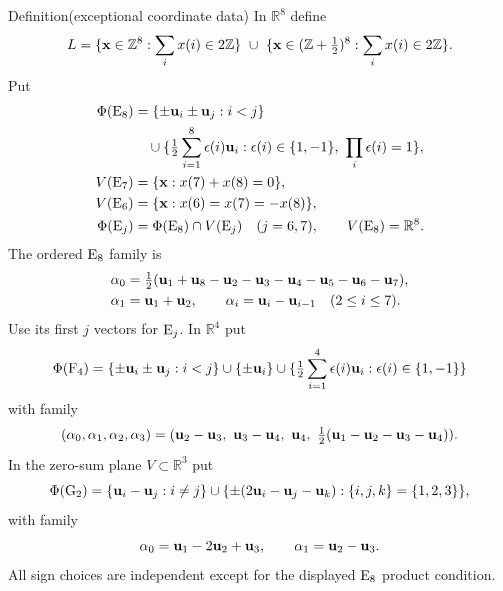 \begin{namedresult}{Definition}{(exceptional coordinate data)}\label{def:rem-exceptional}
In $\mathbb R^8$ define
\begin{equation}\label{eq:E-lattice}
 L=\{{\mathbf x}\in\mathbb Z^8:\sum_i x(i)\in2\mathbb Z\}
 \ \cup\
 \{{\mathbf x}\in(\mathbb Z+\tfrac12)^8:\sum_i x(i)\in2\mathbb Z\}.
\end{equation}
Put
\[
\begin{aligned}
\Phi(\mathrm{E}_8)&=\{\pm{\mathbf u}_i\pm{\mathbf u}_j:i<j\}\\
&\quad\cup\{\tfrac12\sum_{i=1}^8\epsilon(i){\mathbf u}_i:
                \epsilon(i)\in\{1,-1\},\ \prod_i\epsilon(i)=1\},\\
V(\mathrm{E}_7)&=\{{\mathbf x}:x(7)+x(8)=0\},\\
V(\mathrm{E}_6)&=\{{\mathbf x}:x(6)=x(7)=-x(8)\},\\
\Phi(\mathrm{E}_j)&=\Phi(\mathrm{E}_8)\cap V(\mathrm{E}_j)\quad(j=6,7),
\qquad V(\mathrm{E}_8)=\mathbb R^8.
\end{aligned}
\]
The ordered $\mathrm{E}_8$ family is
\begin{equation}\label{eq:E-base}
\begin{split}
\alpha_0&=\tfrac12({\mathbf u}_1+{\mathbf u}_8-{\mathbf u}_2-{\mathbf u}_3-{\mathbf u}_4-{\mathbf u}_5-{\mathbf u}_6-{\mathbf u}_7),\\
\alpha_1&={\mathbf u}_1+{\mathbf u}_2,\qquad
\alpha_i={\mathbf u}_i-{\mathbf u}_{i-1}\quad(2\leq i\leq7).
\end{split}
\end{equation}
Use its first $j$ vectors for $\mathrm{E}_j$.
In $\mathbb R^4$ put
\begin{equation}\label{eq:F-roots}
\Phi(\mathrm{F}_4)=\{\pm{\mathbf u}_i\pm{\mathbf u}_j:i<j\}\cup\{\pm{\mathbf u}_i\}
\cup\{\tfrac12\sum_{i=1}^4\epsilon(i){\mathbf u}_i:\epsilon(i)\in\{1,-1\}\}
\end{equation}
with family
\begin{equation}\label{eq:F-base}
(\alpha_0,\alpha_1,\alpha_2,\alpha_3)=
({\mathbf u}_2-{\mathbf u}_3,\ {\mathbf u}_3-{\mathbf u}_4,\ {\mathbf u}_4,\
\tfrac12({\mathbf u}_1-{\mathbf u}_2-{\mathbf u}_3-{\mathbf u}_4)).
\end{equation}
In the zero-sum plane $V\subset\mathbb R^3$ put
\begin{equation}\label{eq:G-roots}
\Phi(\mathrm{G}_2)=\{{\mathbf u}_i-{\mathbf u}_j:i\ne j\}\cup
\{\pm(2{\mathbf u}_i-{\mathbf u}_j-{\mathbf u}_k):\{i,j,k\}=\{1,2,3\}\},
\end{equation}
with family
\begin{equation}\label{eq:G-base}
\alpha_0={\mathbf u}_1-2{\mathbf u}_2+{\mathbf u}_3,\qquad \alpha_1={\mathbf u}_2-{\mathbf u}_3.
\end{equation}
All sign choices are independent except for the displayed $\mathrm{E}_8$
product condition.
\end{namedresult}


